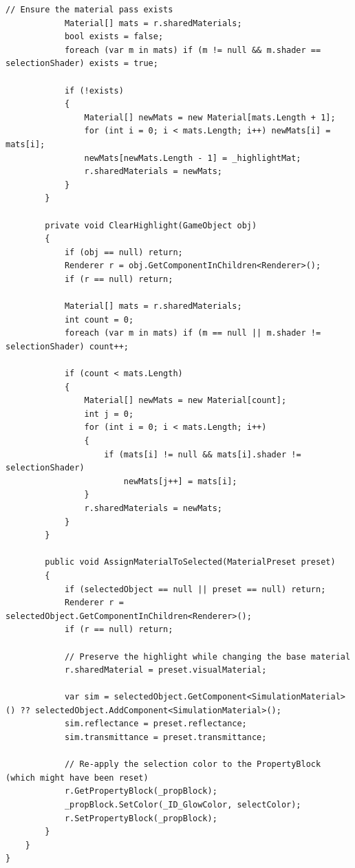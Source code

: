 \begin{lstlisting}[language={[Sharp]C}, caption={ObjectPicker.cs: Crosshair-based physical material editor and artifact interaction logic.}, label={lst:objectpicker}]
            // Ensure the material pass exists
            Material[] mats = r.sharedMaterials;
            bool exists = false;
            foreach (var m in mats) if (m != null && m.shader == selectionShader) exists = true;

            if (!exists)
            {
                Material[] newMats = new Material[mats.Length + 1];
                for (int i = 0; i < mats.Length; i++) newMats[i] = mats[i];
                newMats[newMats.Length - 1] = _highlightMat;
                r.sharedMaterials = newMats;
            }
        }

        private void ClearHighlight(GameObject obj)
        {
            if (obj == null) return;
            Renderer r = obj.GetComponentInChildren<Renderer>();
            if (r == null) return;

            Material[] mats = r.sharedMaterials;
            int count = 0;
            foreach (var m in mats) if (m == null || m.shader != selectionShader) count++;

            if (count < mats.Length)
            {
                Material[] newMats = new Material[count];
                int j = 0;
                for (int i = 0; i < mats.Length; i++)
                {
                    if (mats[i] != null && mats[i].shader != selectionShader)
                        newMats[j++] = mats[i];
                }
                r.sharedMaterials = newMats;
            }
        }

        public void AssignMaterialToSelected(MaterialPreset preset)
        {
            if (selectedObject == null || preset == null) return;
            Renderer r = selectedObject.GetComponentInChildren<Renderer>();
            if (r == null) return;

            // Preserve the highlight while changing the base material
            r.sharedMaterial = preset.visualMaterial;
            
            var sim = selectedObject.GetComponent<SimulationMaterial>() ?? selectedObject.AddComponent<SimulationMaterial>();
            sim.reflectance = preset.reflectance;
            sim.transmittance = preset.transmittance;

            // Re-apply the selection color to the PropertyBlock (which might have been reset)
            r.GetPropertyBlock(_propBlock);
            _propBlock.SetColor(_ID_GlowColor, selectColor);
            r.SetPropertyBlock(_propBlock);
        }
    }
}
\end{lstlisting}

